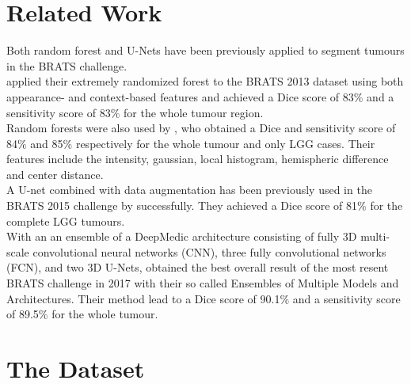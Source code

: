 \documentclass[final]{article}
\begin{document}
\section{Related Work}  \label{sec:related}
Both random forest and U-Nets have been previously applied to segment tumours in the BRATS challenge. \\

\cite{pinto2015} applied their extremely randomized forest to the BRATS 2013 dataset using both appearance- and context-based features and achieved a Dice score of 83$\%$ and a sensitivity score of 83$\%$ for the whole tumour region. \\ Random forests were also used by \cite{maier2015}, who obtained a Dice and sensitivity score of 84$\%$ and 85$\%$ respectively for the whole tumour and only LGG cases. Their features include the intensity, gaussian, local histogram, hemispheric difference and center distance.\\
A U-net combined with data augmentation has been previously used in the BRATS 2015 challenge by \cite{dong2017} successfully. They achieved a Dice score of 81$\%$ for the complete LGG tumours. \\
With an an ensemble of a DeepMedic architecture consisting of fully 3D multi-scale convolutional neural networks (CNN), three fully convolutional networks (FCN), and two 3D U-Nets, \cite{brats2017short} obtained the best overall result of the most resent BRATS challenge in 2017 \citep{bakas2017advancing} with their so called Ensembles of Multiple Models and Architectures. Their method lead to a Dice score of 90.1$\%$ and a sensitivity score of 89.5$\%$ for the whole tumour.

\section{The Dataset} \label{sec:dataset}
\end{document}
